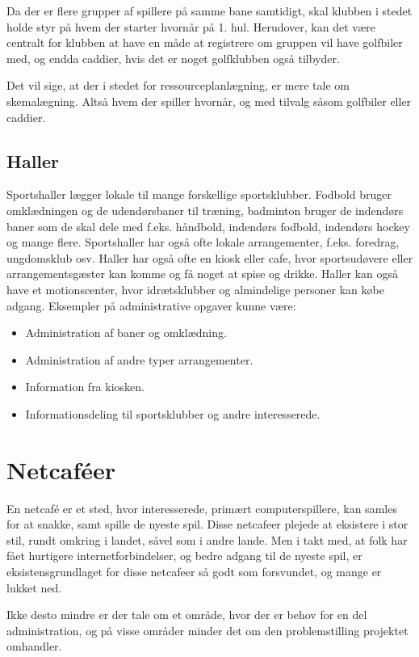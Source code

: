 Da der er flere grupper af spillere på samme bane samtidigt, skal klubben i stedet holde styr på hvem der starter hvornår på 1. hul. Herudover, kan det være centralt for klubben at have en måde at registrere om gruppen vil have golfbiler med, og endda caddier, hvis det er noget golfklubben også tilbyder.

Det vil sige, at der i stedet for ressourceplanlægning, er mere tale om skemalægning. Altså hvem der spiller hvornår, og med tilvalg såsom golfbiler eller caddier.


\subsection{Haller}
Sportshaller lægger lokale til mange forskellige sportsklubber. Fodbold bruger omklædningen og de udendørsbaner til træning, badminton bruger de indendørs baner som de skal dele med f.eks. håndbold, indendørs fodbold, indendørs hockey og mange flere. Sportshaller har også ofte lokale arrangementer, f.eks. foredrag, ungdomsklub osv. 
Haller har også ofte en kiosk eller cafe, hvor sportsudøvere eller arrangementsgæster kan komme og få noget at spise og drikke. 
Haller kan også have et motionscenter, hvor idrætsklubber og almindelige personer kan købe adgang. 
Eksempler på administrative opgaver kunne være:
\begin{itemize}
\item Administration af baner og omklædning.
\item Administration af andre typer arrangementer.
\item Information fra kiosken.
\item Informationsdeling til sportsklubber og andre interesserede.
\end{itemize}


\section{Netcaféer}\label{chap:netcafeer}

En netcafé er et sted, hvor interesserede, primært computerspillere, kan samles for at snakke, samt spille de
nyeste spil. Disse netcafeer plejede at eksistere i stor stil, rundt omkring i landet, såvel som i andre
lande. Men i takt med, at folk har fået hurtigere internetforbindelser, og bedre adgang til de nyeste spil, er
eksistensgrundlaget for disse netcafeer så godt som forsvundet, og mange er lukket ned.

Ikke desto mindre er der tale om et område, hvor der er behov for en del administration, og på visse områder
minder det om den problemstilling projektet omhandler.


